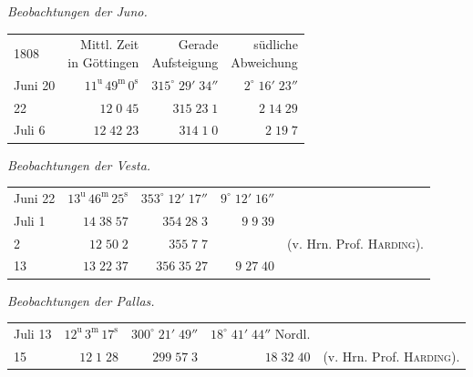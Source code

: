 \begin{center}\emph{Beobachtungen der Juno.}\end{center}

\begin{center}\fontsize{10}{12}\selectfont\setlength{\tabcolsep}{3pt}\renewcommand{\arraystretch}{1.15}\begin{tabular}{lrrr}
1808 & \shortstack{Mittl. Zeit\\in Göttingen} & \shortstack{Gerade\\Aufsteigung} & \shortstack{südliche\\Abweichung}\\
Juni 20 & $11^{\text{u}}\,49^{\text{m}}\,0^{\text{s}}$ & $315^\circ\;29'\;34''$ & $2^\circ\;16'\;23''$\\
22 & $12\;0\;45$ & $315\;23\;1$ & $2\;14\;29$\\
Juli 6 & $12\;42\;23$ & $314\;1\;0$ & $2\;19\;7$\\
\end{tabular}\end{center}

\begin{center}\emph{Beobachtungen der Vesta.}\end{center}

\begin{center}\fontsize{9}{12}\selectfont\setlength{\tabcolsep}{3pt}\renewcommand{\arraystretch}{1.15}\begin{tabular}{lrrrl}
Juni 22 & $13^{\text{u}}\,46^{\text{m}}\,25^{\text{s}}$ & $353^\circ\;12'\;17''$ & $9^\circ\;12'\;16''$ & \\
Juli 1 & $14\;38\;57$ & $354\;28\;3$ & $9\;9\;39$ & \\
2 & $12\;50\;2$ & $355\;7\;7$ & & (v. Hrn. Prof. \textsc{Harding}).\\
13 & $13\;22\;37$ & $356\;35\;27$ & $9\;27\;40$ & \\
\end{tabular}\end{center}

\begin{center}\emph{Beobachtungen der Pallas.}\end{center}

\begin{center}\fontsize{9}{12}\selectfont\setlength{\tabcolsep}{3pt}\renewcommand{\arraystretch}{1.15}\begin{tabular}{lrrrl}
Juli 13 & $12^{\text{u}}\,3^{\text{m}}\,17^{\text{s}}$ & $300^\circ\;21'\;49''$ & $18^\circ\;41'\;44''$ Nordl. & \\
15 & $12\;1\;28$ & $299\;57\;3$ & $18\;32\;40$ & (v. Hrn. Prof. \textsc{Harding}).\\
\end{tabular}\end{center}

